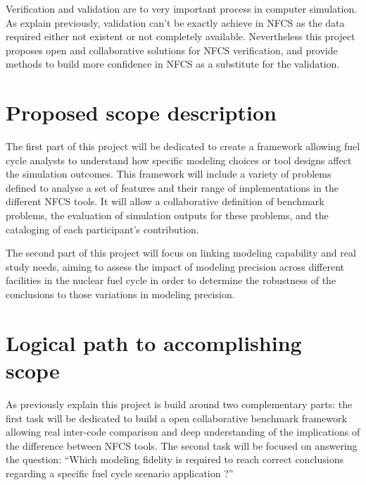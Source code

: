 Verification and validation are to very important process in computer
simulation. As explain previously, validation can't be exactly achieve in NFCS
as the data required either not existent or not completely available.
Nevertheless this project proposes open and collaborative solutions for NFCS
verification, and provide methods to build more confidence in NFCS as a
substitute for the validation.


\section{Proposed scope description}


The first part of this project will be dedicated to create a framework allowing
fuel cycle analysts to understand how specific modeling choices or tool designs
affect the simulation outcomes. This framework will include a variety of
problems defined to analyse a set of features and their range of implementations
in the different NFCS tools. It will allow a collaborative definition of
benchmark problems, the evaluation of simulation outputs for these problems, and
the cataloging of each participant’s contribution. 

The second part of this project will focus on linking modeling capability and
real study needs, aiming to assess the impact of modeling precision across
different facilities in the nuclear fuel cycle in order to determine the
robustness of the conclusions to those variations in modeling precision. 



\section{Logical path to accomplishing scope}

As previously explain this project is build around two complementary parts: the
first task will be dedicated to build a open collaborative benchmark framework
allowing real inter-code comparison and deep understanding of the implications
of the difference between NFCS tools. The second task will be focused on
answering the question: ``Which modeling fidelity is required to reach correct
conclusions regarding a specific fuel cycle scenario application ?''


